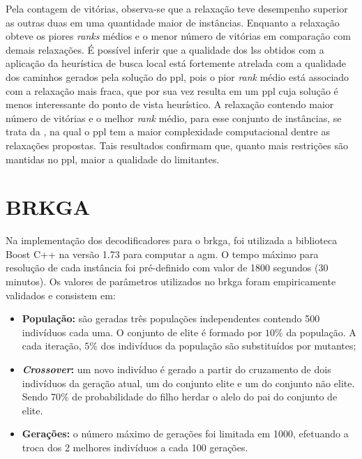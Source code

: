 Pela contagem  de vitórias,  observa-se que a  relaxação {\rlq}  teve desempenho
superior  as outras  duas  em uma  quantidade maior  de  instâncias. Enquanto  a
relaxação {\rlu}  obteve os  piores \textit{ranks}  médios e  o menor  número de
vitórias em comparação com demais relaxações. É possível inferir que a qualidade
dos  \gls{ls}s  obtidos com  a  aplicação  da  heurística  de busca  local  está
fortemente  atrelada  com a  qualidade  dos  caminhos  gerados pela  solução  do
\gls{ppl}, pois o  pior \textit{rank} médio está associado com  a relaxação mais
fraca, que por sua vez resulta em um \gls{ppl} cuja solução é menos interessante
do ponto de vista heurístico. A relaxação  contendo maior número de vitórias e o
melhor  \textit{rank} médio,  para  esse  conjunto de  instâncias,  se trata  da
{\rlq}, na  qual o \gls{ppl}  tem a  maior complexidade computacional  dentre as
relaxações propostas. Tais resultados confirmam  que, quanto mais restrições são
mantidas no \gls{ppl}, maior a qualidade do limitantes.

\section{BRKGA}

Na  implementação  dos  decodificadores  para o  \gls{brkga},  foi  utilizada  a
biblioteca Boost  C++ na versão 1.73  para computar a \gls{agm}.  O tempo máximo
para resolução de cada instância foi pré-definido com valor de 1800 segundos (30
minutos). Os valores de parâmetros utilizados no \gls{brkga} foram empiricamente
validados e consistem em:

\begin{itemize}
\item \textbf{População:} são geradas três populações independentes contendo 500
indivíduos cada uma.  O conjunto de elite  é formado por $10\%$  da população. A
cada iteração, $5\%$ dos indivíduos da população são substituídos por mutantes;
\item  \textbf{\textit{Crossover}:}  um novo  indivíduo  é  gerado a  partir  do
cruzamento de  dois indivíduos da  geração atual, um do  conjunto elite e  um do
conjunto não elite. Sendo 70$\%$ de probabilidade do filho herdar o alelo do pai
do conjunto de elite.
\item  \textbf{Gerações:} o  número máximo  de  gerações foi  limitada em  1000,
efetuando a troca dos 2 melhores indivíduos a cada 100 gerações.
\end{itemize}


